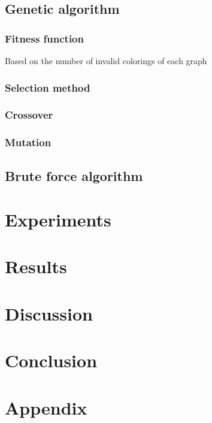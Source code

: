 \documentclass[a4paper]{report}
\begin{document}
			
		\section{Genetic algorithm}
			\subsection{Fitness function}
			Based on the number of invalid colorings of each graph
			\subsection{Selection method}
			\subsection{Crossover}
			\subsection{Mutation}
		
		\section{Brute force algorithm}
		
		
	\chapter{Experiments}
		
	\chapter{Results}
	
	\chapter{Discussion}
	
	\chapter{Conclusion}
	
	
	
	
	
	\appendix
	\chapter*{Appendix}
\end{document}
